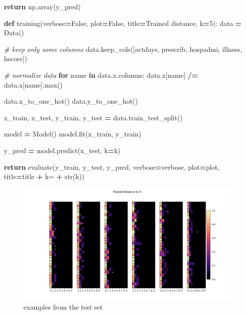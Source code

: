 \documentclass[
]{article}
\newenvironment{Shaded}{\begin{snugshade}}{\end{snugshade}}
\newcommand{\BuiltInTok}[1]{#1}
\newcommand{\CommentTok}[1]{\textcolor[rgb]{0.56,0.35,0.01}{\textit{#1}}}
\newcommand{\ControlFlowTok}[1]{\textcolor[rgb]{0.13,0.29,0.53}{\textbf{#1}}}
\newcommand{\DecValTok}[1]{\textcolor[rgb]{0.00,0.00,0.81}{#1}}
\newcommand{\KeywordTok}[1]{\textcolor[rgb]{0.13,0.29,0.53}{\textbf{#1}}}
\newcommand{\NormalTok}[1]{#1}
\newcommand{\OperatorTok}[1]{\textcolor[rgb]{0.81,0.36,0.00}{\textbf{#1}}}
\newcommand{\StringTok}[1]{\textcolor[rgb]{0.31,0.60,0.02}{#1}}
\newcommand{\VariableTok}[1]{\textcolor[rgb]{0.00,0.00,0.00}{#1}}
\begin{document}
\begin{Shaded}
\begin{Highlighting}[]
        \ControlFlowTok{return}\NormalTok{ np.array(y\_pred)}


\KeywordTok{def}\NormalTok{ training(verbose}\OperatorTok{=}\VariableTok{False}\NormalTok{, plot}\OperatorTok{=}\VariableTok{False}\NormalTok{, title}\OperatorTok{=}\StringTok{\textquotesingle{}Trained distance\textquotesingle{}}\NormalTok{, k}\OperatorTok{=}\DecValTok{5}\NormalTok{):}
\NormalTok{    data }\OperatorTok{=}\NormalTok{ Data()}

    \CommentTok{\# keep only some columns}
\NormalTok{    data.keep\_cols([}\StringTok{\textquotesingle{}actdays\textquotesingle{}}\NormalTok{, }\StringTok{\textquotesingle{}prescrib\textquotesingle{}}\NormalTok{, }\StringTok{\textquotesingle{}hospadmi\textquotesingle{}}\NormalTok{, }\StringTok{\textquotesingle{}illness\textquotesingle{}}\NormalTok{, }\StringTok{\textquotesingle{}hscore\textquotesingle{}}\NormalTok{])}

    \CommentTok{\# normalize data}
    \ControlFlowTok{for}\NormalTok{ name }\KeywordTok{in}\NormalTok{ data.x.columns:}
\NormalTok{        data.x[name] }\OperatorTok{/=}\NormalTok{ data.x[name].}\BuiltInTok{max}\NormalTok{()}

\NormalTok{    data.x\_to\_one\_hot()}
\NormalTok{    data.y\_to\_one\_hot()}

\NormalTok{    x\_train, x\_test, y\_train, y\_test }\OperatorTok{=}\NormalTok{ data.train\_test\_split()}

\NormalTok{    model }\OperatorTok{=}\NormalTok{ Model()}
\NormalTok{    model.fit(x\_train, y\_train)}

\NormalTok{    y\_pred }\OperatorTok{=}\NormalTok{ model.predict(x\_test, k}\OperatorTok{=}\NormalTok{k)}

    \ControlFlowTok{return}\NormalTok{ evaluate(y\_train, y\_test, y\_pred, verbose}\OperatorTok{=}\NormalTok{verbose, }
\NormalTok{                    plot}\OperatorTok{=}\NormalTok{plot, title}\OperatorTok{=}\NormalTok{title }\OperatorTok{+} \StringTok{\textquotesingle{} k=\textquotesingle{}} \OperatorTok{+} \BuiltInTok{str}\NormalTok{(k))}
\end{Highlighting}
\end{Shaded}

\begin{figure}
\centering
\includegraphics{figures/trained_distance.png}
\caption{examples from the test set}
\end{figure}
\end{document}
